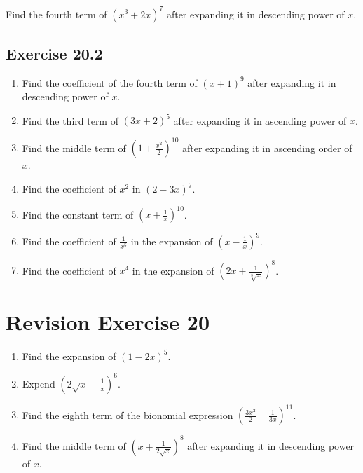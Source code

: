 \documentclass{report}
\begin{document}
\begin{multicols}{2}
  Find the fourth term of $(x^3 + 2x)^7$ after expanding it in descending power
  of $x$.

  \subsection{Exercise 20.2}

  \begin{enumerate}
    \item Find the coefficient of the fourth term of $(x+1)^9$ after expanding it in
          descending power of $x$.

    \item Find the third term of $(3x+2)^5$ after expanding it in ascending power of $x$.

    \item Find the middle term of $\left(1+\frac{x^2}{2}\right)^{10}$ after expanding it
          in ascending order of $x$.

    \item Find the coefficient of $x^2$ in $(2-3x)^7$.

    \item Find the constant term of $\left(x+\frac{1}{x}\right)^{10}$.

    \item Find the coefficient of $\frac{1}{x^5}$ in the expansion of $\left(x -
            \frac{1}{x}\right)^9$.

    \item Find the coefficient of $x^4$ in the expansion of $\left(2x +
            \frac{1}{\sqrt[3]{x}}\right)^8$.
  \end{enumerate}

  \section{Revision Exercise 20}

  \begin{enumerate}
    \item Find the expansion of $(1 - 2x)^5$.

    \item Expend $\left(2\sqrt{x} - \frac{1}{x}\right)^6$.

    \item Find the eighth term of the bionomial expression $\left(\frac{3x^2}{2} -
            \frac{1}{3x}\right)^{11}$.

    \item Find the middle term of $\left(x+\frac{1}{2\sqrt{x}}\right)^8$ after expanding
          it in descending power of $x$.


\end{enumerate}
\end{multicols}
\end{document}
